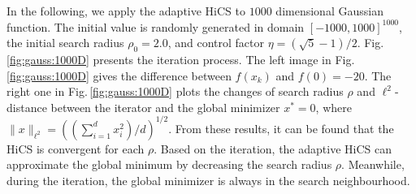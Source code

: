 \documentclass[mathpazo]{csam}
\theoremstyle{remark}
\begin{document}
In the following, we apply the adaptive HiCS to $1000$ dimensional
Gaussian function. The initial value is randomly generated in
domain $[-1000,1000]^{1000}$, the initial search radius $\rho_0 = 2.0$,
and control factor $\eta=(\sqrt{5}-1)/2$. 
Fig.\,\ref{fig:gauss:1000D} presents the iteration process.
The left image in Fig.\,\ref{fig:gauss:1000D} gives
the difference between $f(x_k)$ and $f(0)=-20$. 
The right one in Fig.\,\ref{fig:gauss:1000D} 
plots the changes of search radius $\rho$ and $\ell^2$-distance between
the iterator and the global minimizer $x^*=0$, where $\|x\|_{\ell^2}=\left(
(\sum_{i=1}^d x_i^2) / d\right)^{1/2}$.
From these results, it can be found that the HiCS is convergent
for each $\rho$. Based on the iteration, the adaptive HiCS 
can approximate the global minimum by decreasing the search radius $\rho$. 
Meanwhile, during the iteration, the global minimizer is always in the
search neighbourhood. 
\end{document}
